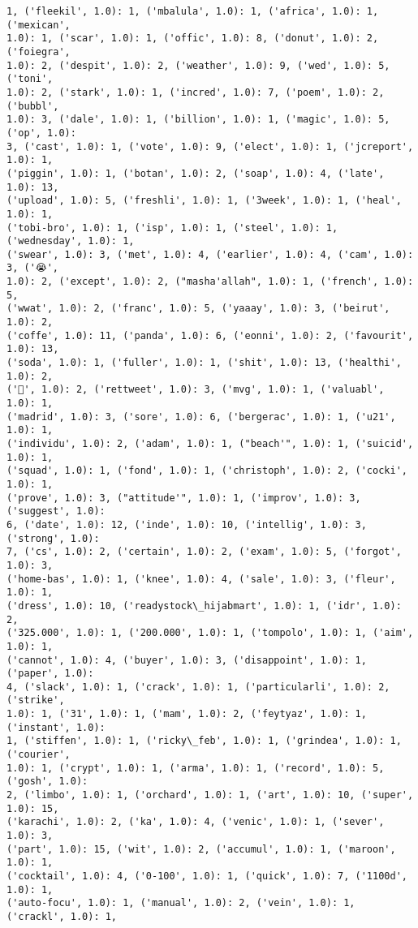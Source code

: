 \documentclass[11pt]{article}
\begin{document}
\begin{Verbatim}[commandchars=\\\{\}]
1, ('fleekil', 1.0): 1, ('mbalula', 1.0): 1, ('africa', 1.0): 1, ('mexican',
1.0): 1, ('scar', 1.0): 1, ('offic', 1.0): 8, ('donut', 1.0): 2, ('foiegra',
1.0): 2, ('despit', 1.0): 2, ('weather', 1.0): 9, ('wed', 1.0): 5, ('toni',
1.0): 2, ('stark', 1.0): 1, ('incred', 1.0): 7, ('poem', 1.0): 2, ('bubbl',
1.0): 3, ('dale', 1.0): 1, ('billion', 1.0): 1, ('magic', 1.0): 5, ('op', 1.0):
3, ('cast', 1.0): 1, ('vote', 1.0): 9, ('elect', 1.0): 1, ('jcreport', 1.0): 1,
('piggin', 1.0): 1, ('botan', 1.0): 2, ('soap', 1.0): 4, ('late', 1.0): 13,
('upload', 1.0): 5, ('freshli', 1.0): 1, ('3week', 1.0): 1, ('heal', 1.0): 1,
('tobi-bro', 1.0): 1, ('isp', 1.0): 1, ('steel', 1.0): 1, ('wednesday', 1.0): 1,
('swear', 1.0): 3, ('met', 1.0): 4, ('earlier', 1.0): 4, ('cam', 1.0): 3, ('😭',
1.0): 2, ('except', 1.0): 2, ("masha'allah", 1.0): 1, ('french', 1.0): 5,
('wwat', 1.0): 2, ('franc', 1.0): 5, ('yaaay', 1.0): 3, ('beirut', 1.0): 2,
('coffe', 1.0): 11, ('panda', 1.0): 6, ('eonni', 1.0): 2, ('favourit', 1.0): 13,
('soda', 1.0): 1, ('fuller', 1.0): 1, ('shit', 1.0): 13, ('healthi', 1.0): 2,
('💓', 1.0): 2, ('rettweet', 1.0): 3, ('mvg', 1.0): 1, ('valuabl', 1.0): 1,
('madrid', 1.0): 3, ('sore', 1.0): 6, ('bergerac', 1.0): 1, ('u21', 1.0): 1,
('individu', 1.0): 2, ('adam', 1.0): 1, ("beach'", 1.0): 1, ('suicid', 1.0): 1,
('squad', 1.0): 1, ('fond', 1.0): 1, ('christoph', 1.0): 2, ('cocki', 1.0): 1,
('prove', 1.0): 3, ("attitude'", 1.0): 1, ('improv', 1.0): 3, ('suggest', 1.0):
6, ('date', 1.0): 12, ('inde', 1.0): 10, ('intellig', 1.0): 3, ('strong', 1.0):
7, ('cs', 1.0): 2, ('certain', 1.0): 2, ('exam', 1.0): 5, ('forgot', 1.0): 3,
('home-bas', 1.0): 1, ('knee', 1.0): 4, ('sale', 1.0): 3, ('fleur', 1.0): 1,
('dress', 1.0): 10, ('readystock\_hijabmart', 1.0): 1, ('idr', 1.0): 2,
('325.000', 1.0): 1, ('200.000', 1.0): 1, ('tompolo', 1.0): 1, ('aim', 1.0): 1,
('cannot', 1.0): 4, ('buyer', 1.0): 3, ('disappoint', 1.0): 1, ('paper', 1.0):
4, ('slack', 1.0): 1, ('crack', 1.0): 1, ('particularli', 1.0): 2, ('strike',
1.0): 1, ('31', 1.0): 1, ('mam', 1.0): 2, ('feytyaz', 1.0): 1, ('instant', 1.0):
1, ('stiffen', 1.0): 1, ('ricky\_feb', 1.0): 1, ('grindea', 1.0): 1, ('courier',
1.0): 1, ('crypt', 1.0): 1, ('arma', 1.0): 1, ('record', 1.0): 5, ('gosh', 1.0):
2, ('limbo', 1.0): 1, ('orchard', 1.0): 1, ('art', 1.0): 10, ('super', 1.0): 15,
('karachi', 1.0): 2, ('ka', 1.0): 4, ('venic', 1.0): 1, ('sever', 1.0): 3,
('part', 1.0): 15, ('wit', 1.0): 2, ('accumul', 1.0): 1, ('maroon', 1.0): 1,
('cocktail', 1.0): 4, ('0-100', 1.0): 1, ('quick', 1.0): 7, ('1100d', 1.0): 1,
('auto-focu', 1.0): 1, ('manual', 1.0): 2, ('vein', 1.0): 1, ('crackl', 1.0): 1,

\end{Verbatim}
\end{document}
